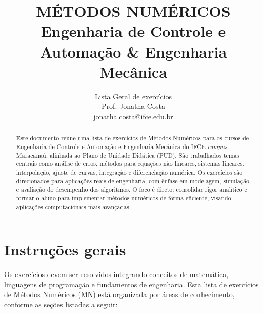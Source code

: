 \documentclass[12pt]{elsarticle}
\begin{document}
\begin{frontmatter}
	\title{\bf MÉTODOS NUMÉRICOS\\
	\textnormal{\normalsize Engenharia de Controle e Automação \& Engenharia Mecânica}
}
\author{
	\vspace{-0.5cm}
	\textnormal{
		Lista Geral de exercícios\\
		Prof. Jonatha Costa\\
		jonatha.costa@ifce.edu.br}
		\vspace{-1.25cm} %
	}
	\begin{abstract} 
Este documento reúne uma lista de exercícios de Métodos Numéricos para os cursos de Engenharia de Controle e Automação e Engenharia Mecânica do IFCE \textit{campus} Maracanaú,
alinhada ao Plano de Unidade Didática (PUD). São trabalhados temas centrais como análise de erros, métodos para equações não lineares, sistemas lineares, interpolação,
ajuste de curvas, integração e diferenciação numérica. Os exercícios são direcionados para aplicações reais de engenharia, com ênfase em modelagem,
simulação e avaliação do desempenho dos algoritmos. O foco é direto: consolidar rigor analítico e formar o aluno para implementar métodos numéricos de forma eficiente, 
visando aplicações computacionais mais avançadas.	
\end{abstract}
	
\end{frontmatter}
\section*{Instruções gerais}

Os exercícios devem ser resolvidos integrando conceitos de matemática, linguagens de programação e fundamentos de engenharia.
Esta lista de exercícios de Métodos Numéricos (MN) está organizada por áreas de conhecimento, conforme as seções listadas a seguir:
\end{document}

